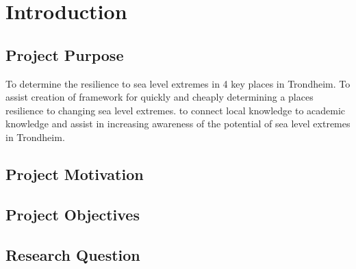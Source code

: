 




\chapter{Introduction}

\section{Project Purpose}
To determine the resilience to sea level extremes in 4 key places in Trondheim. To assist creation of framework for quickly and cheaply determining a places resilience to changing sea level extremes. to connect local knowledge to academic knowledge and assist in increasing awareness of the potential of sea level extremes in Trondheim. 

\section{Project Motivation}

\section{Project Objectives}

\section{Research Question}


